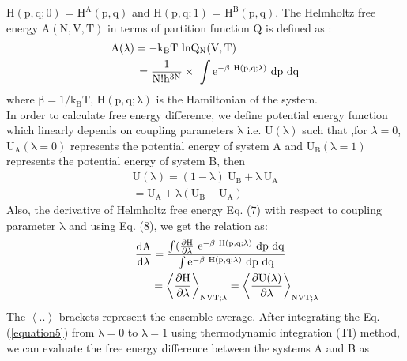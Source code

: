   $\mathrm{H(p, q; 0)}$ = $\mathrm{H^{A}(p, q)}$ and
  $\mathrm{H(p, q; 1)}$ = $\mathrm{H^{B}(p, q)}$. The Helmholtz free energy $\mathrm{A (N, V, T)}$ in terms of partition function $\mathrm{Q}$ is defined as
 \cite{gromacs user manual, Pathria, Huang}:
 \begin{eqnarray}
 \mathrm{A (\lambda) = -k_B T~ ln Q_N(V,T)} \nonumber
  \hspace*{2cm}  \\ =\mathrm{\frac{1}{N!h^{3N}}}
  \times\mathrm{\ \int e^{-\beta~H(p, q; \lambda)}~ dp ~ dq}\hfill
 \end{eqnarray}
 where $\mathrm{\beta = 1/k_BT}$, $\mathrm{H(p, q; \lambda)}$ is the Hamiltonian of the system. \\In order to calculate free energy difference, we define potential energy function which linearly depends on coupling parameters $\mathrm{\lambda}$ i.e. $\mathrm{U(\lambda)}$ such that ,for $\lambda = 0$, $\mathrm{U_{A}(\lambda=0)}$ represents the potential energy of system $\mathrm{A}$ and $\mathrm{U_{B}(\lambda=1)}$ represents the potential energy of system $\mathrm{B}$, then 
 \begin{eqnarray}
 \mathrm{U(\lambda)}=\mathrm{(1-\lambda)~U_{B}} + \mathrm{\lambda~U_{A}}\nonumber\\
 =\mathrm{U_{A}}+ \mathrm{\lambda(U_{B} - U_{A})} 
 \end{eqnarray}
 Also, the derivative of Helmholtz free energy Eq. (7)  with respect to coupling parameter $\mathrm{\lambda}$ and using  Eq. (8), we get the relation as:
 \begin{eqnarray}
 \mathrm{\frac{dA}{d\lambda}} = \mathrm{\frac{\int(\frac{\partial H}{\partial \lambda}~e^{-\beta~H(p, q; \lambda)}~ dp~dq}{\int e^{-\beta~H(p, q; \lambda)}~ dp~dq}} ~~~~~~~~~\nonumber\\
 \hspace*{2cm}= \mathrm{ \left\langle \frac{\partial H}{\partial\lambda}\right\rangle_{NVT;\lambda}}=
 \mathrm{\left\langle\frac{\partial U(\lambda)}{\partial\lambda}\right\rangle_{NVT;\lambda}}
 \label{equation5}
 \end{eqnarray}
  The $\mathrm{\left\langle ..\right\rangle }$ brackets represent the ensemble average. After integrating the Eq.(\ref{equation5})  from $\mathrm{\lambda=0}$ to  $\mathrm{\lambda=1}$ using thermodynamic integration (TI) method, we can evaluate the free energy difference between the systems A and B as
  
